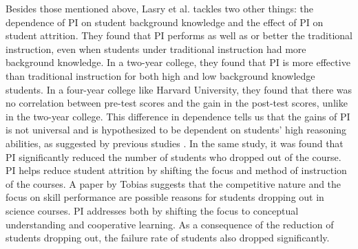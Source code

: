 Besides those mentioned above, Lasry et al. \cite{lasry2008peer} tackles two other things: the dependence of PI on student background knowledge and the effect of PI on student attrition.
They found that PI performs as well as or better the traditional instruction, even when students under traditional instruction had more background knowledge.
In a two-year college, they found that PI is more effective than traditional instruction for both high and low background knowledge students.
In a four-year college like Harvard University, they found that there was no correlation between pre-test scores and the gain in the post-test scores, unlike in the two-year college.
This difference in dependence tells us that the gains of PI is not universal and is hypothesized to be dependent on students' high reasoning abilities, as suggested by previous studies \cite{coletta2005interpreting}.
In the same study, it was found that PI significantly reduced the number of students who dropped out of the course.
PI helps reduce student attrition by shifting the focus and method of instruction of the courses.
A paper by Tobias \cite{tobias1990they} suggests that the competitive nature and the focus on skill performance are possible reasons for students dropping out in science courses.
PI addresses both by shifting the focus to conceptual understanding and cooperative learning.
As a consequence of the reduction of students dropping out, the failure rate of students also dropped significantly.




